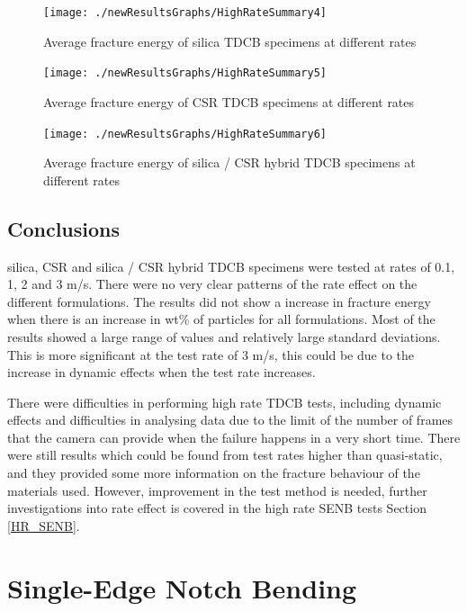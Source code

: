 \documentclass[numbers=noendperiod,chapterprefix=on]{icldt} %
\begin{document}
\begin{figure}[!htpb]
\centering
\texttt{[image: ./newResultsGraphs/HighRateSummary4]}
\caption{Average fracture energy of silica TDCB specimens at different rates} \label{HighRateSummary4}
\end{figure}
\FloatBarrier

\begin{figure}[!htpb]
\centering
\texttt{[image: ./newResultsGraphs/HighRateSummary5]}
\caption{Average fracture energy of CSR TDCB specimens at different rates} \label{HighRateSummary5}
\end{figure}
\FloatBarrier

\begin{figure}[!htpb]
\centering
\texttt{[image: ./newResultsGraphs/HighRateSummary6]}
\caption{Average fracture energy of silica / CSR hybrid TDCB specimens at different rates} \label{HighRateSummary6}
\end{figure}
\FloatBarrier

\section{Conclusions}
silica, CSR and silica / CSR hybrid TDCB specimens were tested at rates of 0.1, 1, 2 and 3 m/s. There were no very clear patterns of the rate effect on the different formulations. The results did not show a increase in fracture energy when there is an increase in wt\% of particles for all formulations. Most of the results showed a large range of values and relatively large standard deviations. This is more significant at the test rate of 3 m/s, this could be due to the increase in dynamic effects when the test rate increases. 

There were difficulties in performing high rate TDCB tests, including dynamic effects and difficulties in analysing data due to the limit of the number of frames that the camera can provide when the failure happens in a very short time. There were still results which could be found from test rates higher than quasi-static, and they provided some more information on the fracture behaviour of the materials used. However, improvement in the test method is needed, further investigations into rate effect is covered in the high rate SENB tests Section \ref{HR_SENB}.   

\chapter{Single-Edge Notch Bending}  \label{SENB_ch}
\end{document}
